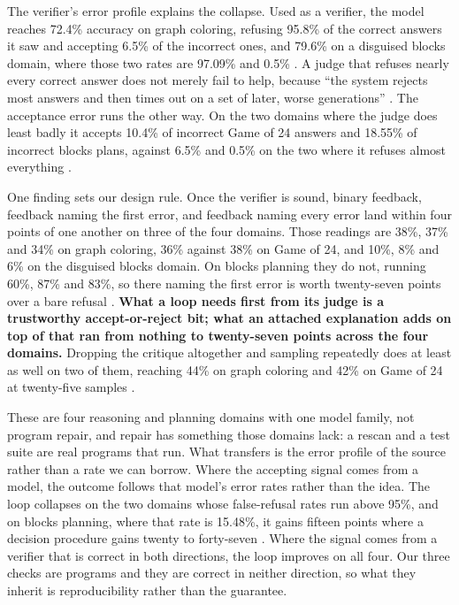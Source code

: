 The verifier's error profile explains the collapse. Used as a verifier, the model reaches 72.4\%
accuracy on graph coloring, refusing 95.8\% of the correct answers it saw and accepting 6.5\% of the
incorrect ones, and 79.6\% on a disguised blocks domain, where those two rates are 97.09\% and 0.5\%
\citep[Table~2]{stechly2025selfverification}. A judge
that refuses nearly every correct answer does not merely fail to help, because ``the system rejects
most answers and then times out on a set of later, worse generations''
\citep[\S5]{stechly2025selfverification}. The acceptance error runs the other way. On the two
domains where the judge does least badly it accepts 10.4\% of incorrect Game of 24 answers and
18.55\% of incorrect blocks plans, against 6.5\% and 0.5\% on the two where it refuses almost
everything \citep[Table~2]{stechly2025selfverification}.

One finding sets our design rule. Once the verifier is sound, binary feedback, feedback naming the
first error, and feedback naming every error land within four points of one another on three of the
four domains. Those readings are 38\%, 37\% and 34\% on graph coloring, 36\% against 38\% on Game of
24, and 10\%, 8\% and 6\% on the disguised blocks domain. On blocks planning they do not, running 60\%, 87\% and
83\%, so there naming the first error is worth twenty-seven points over a bare refusal
\citep[Table~1]{stechly2025selfverification}. \textbf{What a loop needs first from its judge is a
trustworthy accept-or-reject bit; what an attached explanation adds on top of that ran from nothing
to twenty-seven points across the four domains.} Dropping the critique altogether and sampling
repeatedly does at least as well on two of them, reaching 44\% on graph coloring and 42\% on Game of
24 at twenty-five samples \citep[Table~1]{stechly2025selfverification}.

These are four reasoning and planning domains with one model family, not program repair, and repair
has something those domains lack: a rescan and a test suite are real programs that run. What
transfers is the error profile of the source rather than a rate we can borrow. Where the accepting
signal comes from a model, the outcome follows that model's error rates rather than the idea. The
loop collapses on the two domains whose false-refusal rates run above 95\%, and on blocks planning, where that rate is
15.48\%, it gains fifteen points where a decision procedure gains twenty to forty-seven
\citep[Tables~1 and 2]{stechly2025selfverification}. Where the signal comes from a verifier that is
correct in both directions, the loop improves on all four. Our three checks are programs and they
are correct in neither direction, so what they inherit is reproducibility rather than the
guarantee.

